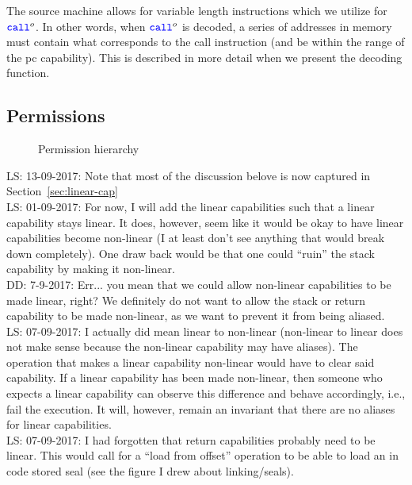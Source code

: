 \documentclass[a3paper]{article}
\newcommand\lau[1]{{\color{purple} \sf \footnotesize {LS: #1}}\\}
\newcommand\dominique[1]{{\color{purple} \sf \footnotesize {DD: #1}}\\}
\newcommand{\sourcecolor}{\color{blue}}
\newcommand{\src}[1]{{\sourcecolor #1}}
\newcommand{\zinstr}[1]{\texttt{#1}}
\newcommand{\scall}[4][]{  
\ifthenelse{\equal{#3#4}{}}
  {\ensuremath{\zinstr{\src{call}}_{#1}^{#2}}}
  {\ensuremath{\zinstr{\src{call}}_{#1}^{#2} \; #3 \; #4}}
}
\newcommand{\plainperm}[1]{\textsc{#1}}
\newcommand{\rwx}{\plainperm{rwx}}
\newcommand{\rx}{\plainperm{rx}}
\newcommand{\rw}{\plainperm{rw}}
\newcommand{\readonly}{\plainperm{r}}
\newcommand{\noperm}{\plainperm{0}}
\begin{document}
The source machine allows for variable length instructions which we utilize for $\scall{o}{}{}$. In other words, when $\scall{o}{}{}$ is decoded, a series of addresses in memory must contain what corresponds to the call instruction (and be within the range of the pc capability). This is described in more detail when we present the decoding function.

\subsection{Permissions}
\begin{figure}[!h]
  \centering

  \caption{Permission hierarchy}
  \label{fig:perm-hier}
\end{figure}
\lau{13-09-2017: Note that most of the discussion belove is now captured in Section~\ref{sec:linear-cap}}
\lau{01-09-2017: For now, I will add the linear capabilities such that a linear capability stays linear. It does, however, seem like it would be okay to have linear capabilities become non-linear (I at least don't see anything that would break down completely). One draw back would be that one could ``ruin'' the stack capability by making it non-linear.}
\dominique{7-9-2017: Err... you mean that we could allow non-linear capabilities to be made linear, right?  We definitely do not want to allow the stack or return capability to be made non-linear, as we want to prevent it from being aliased.}
\lau{07-09-2017: I actually did mean linear to non-linear (non-linear to linear does not make sense because the non-linear capability may have aliases). The operation that makes a linear capability non-linear would have to clear said capability. If a linear capability has been made non-linear, then someone who expects a linear capability can observe this difference and behave accordingly, i.e., fail the execution. It will, however, remain an invariant that there are no aliases for linear capabilities.}
\lau{07-09-2017: I had forgotten that return capabilities probably need to be linear. This would call for a ``load from offset'' operation to be able to load an in code stored seal (see the figure I drew about linking/seals).}
\end{document}
